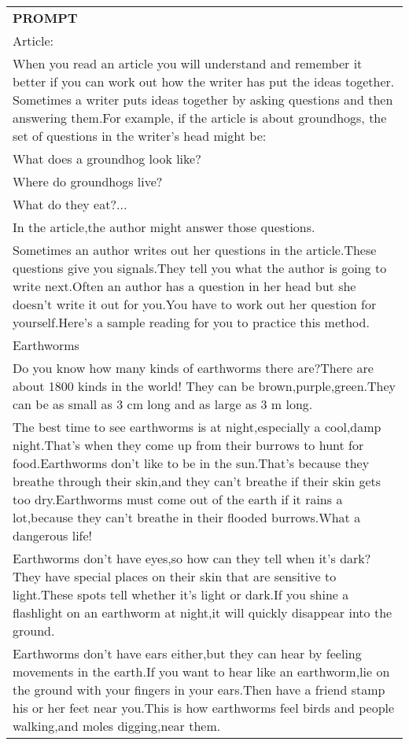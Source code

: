 \begin{table}[ht]
    \centering \small
\begin{tabular}{p{12cm}}
\toprule
\textbf{PROMPT}\\
Article:\\
When you read an article you will understand and remember it better if you can work out how the writer has put the ideas together. Sometimes a writer puts ideas together by asking questions and then answering them.For example, if the article is about groundhogs, the set of questions in the writer's head might be:\\
What does a groundhog look like?\\
Where do groundhogs live?\\
What do they eat?...\\
In the article,the author might answer those questions.\\
Sometimes an author writes out her questions in the article.These questions give you signals.They tell you what the author is going to write next.Often an author has a question in her head but she doesn't write it out for you.You have to work out her question for yourself.Here's a sample reading for you to practice this method.\\
Earthworms\\
Do you know how many kinds of earthworms there are?There are about 1800 kinds in the world! They can be brown,purple,green.They can be as small as 3 cm long and as large as 3 m long.\\
The best time to see earthworms is at night,especially a cool,damp night.That's when they come up from their burrows to hunt for food.Earthworms don't like to be in the sun.That's because they breathe through their skin,and they can't breathe if their skin gets too dry.Earthworms must come out of the earth if it rains a lot,because they can't breathe in their flooded burrows.What a dangerous life!\\
Earthworms don't have eyes,so how can they tell when it's dark? They have special places on their skin that are sensitive to light.These spots tell whether it's light or dark.If you shine a flashlight on an earthworm at night,it will quickly disappear into the ground.\\
Earthworms don't have ears either,but they can hear by feeling movements in the earth.If you want to hear like an earthworm,lie on the ground with your fingers in your ears.Then have a friend stamp his or her feet near you.This is how earthworms feel birds and people walking,and moles digging,near them.\\

\end{tabular}
\end{table}
